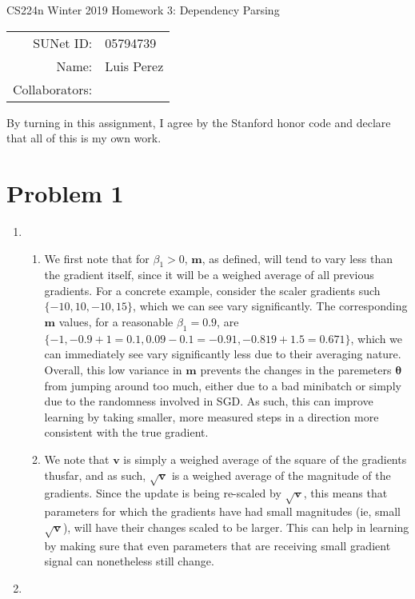 \documentclass[12pt]{article}
\begin{document}
\begin{center}
{\Large CS224n Winter 2019 Homework 3: Dependency Parsing}

\begin{tabular}{rl}
SUNet ID: & 05794739 \\
Name: & Luis Perez \\
Collaborators: &
\end{tabular}
\end{center}

By turning in this assignment, I agree by the Stanford honor code and declare
that all of this is my own work.

\section*{Problem 1}
\begin{enumerate}[label=(\alph*)]
  \item 
    \begin{enumerate}[label=\roman*]
      \item 
        We first note that for $\beta_1 > 0$, $\bm{m}$, as defined, will tend to vary less than the gradient itself, since it will be a weighed average of all previous gradients. For a concrete example, consider the scaler gradients such $\{ -10, 10, -10, 15\}$, which we can see vary significantly. The corresponding $\bm{m}$ values, for a reasonable $\beta_1 = 0.9$, are $\{-1, -0.9 + 1 = 0.1, 0.09 - 0.1 = -0.91, -0.819 + 1.5 = 0.671 \}$, which we can immediately see vary significantly less due to their averaging nature. Overall, this low variance in $\bm{m}$ prevents the changes in the paremeters $\bm{\theta}$ from jumping around too much, either due to a bad minibatch or simply due to the randomness involved in SGD. As such, this can improve learning by taking smaller, more measured steps in a direction more consistent with the true gradient.
      \item
        We note that $\bm{v}$ is simply a weighed average of the square of the gradients thusfar, and as such, $\sqrt{\bm{v}}$ is a weighed average of the magnitude of the gradients. Since the update is being re-scaled by $\sqrt{\bm{v}}$, this means that parameters for which the gradients have had small magnitudes (ie, small $\sqrt{\bm{v}}$), will have their changes scaled to be larger. This can help in learning by making sure that even parameters that are receiving small gradient signal can nonetheless still change.
    \end{enumerate}
    \item 

\end{enumerate}
\end{document}
